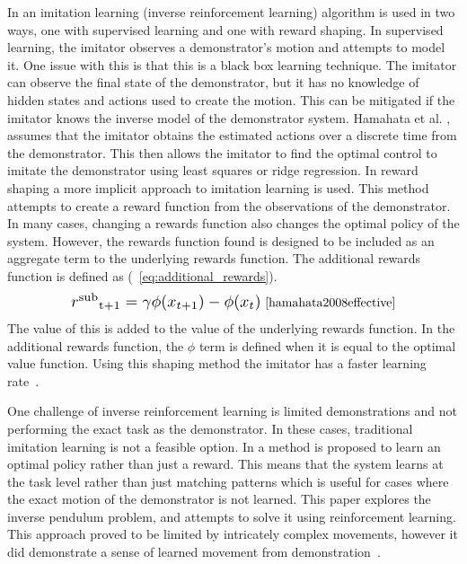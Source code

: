 \documentclass[12pt,american]{report}
\begin{document}
		In \cite{hamahata2008effective} an imitation learning (inverse reinforcement learning) algorithm is used in two ways, one with supervised learning and one with reward shaping. In supervised learning, the imitator observes a demonstrator's motion and attempts to model it. One issue with this is that this is a black box learning technique.  The imitator can observe the final state of the demonstrator, but it has no knowledge of hidden states and actions used to create the motion. This can be mitigated if the imitator knows the inverse model of the demonstrator system. Hamahata et al. \cite{hamahata2008effective}, assumes that the imitator obtains the estimated actions over a discrete time from the demonstrator.  This then allows the imitator to find the optimal control to imitate the demonstrator using least squares or ridge regression. In reward shaping a more implicit approach to imitation learning is used. This method attempts to create a reward function from the observations of the demonstrator.  In many cases, changing a rewards function also changes the optimal policy of the system.  However, the rewards function found is designed to be included as an aggregate term to the underlying rewards function. The additional rewards function is defined as (~\ref{eq:additional_rewards}).
		\begin{equation}
            \label{eq:additional_rewards}
            \resizebox{0.44\textwidth}{!}{$r\textsuperscript{sub}\textsubscript{t+1}= \gamma\phi(x_{t+1})-\phi(x_{t})$}~\cite{hamahata2008effective}
        \end{equation}
		The value of this is added to the value of the underlying rewards function. In the additional rewards function, the \textit{$\phi$} term is defined when it is equal to the optimal value function. Using this shaping method the imitator has a faster learning rate~\cite{hamahata2008effective}.
		
		One challenge of inverse reinforcement learning is limited demonstrations and not performing the exact task as the demonstrator. In these cases, traditional imitation learning is not a feasible option. In \cite{atkeson1997robot} a method is proposed to learn an optimal policy rather than just a reward. This means that the system learns at the task level rather than just matching patterns which is useful for cases where the exact motion of the demonstrator is not learned. This paper explores the inverse pendulum problem, and attempts to solve it using reinforcement learning. This approach proved to be limited by intricately complex movements, however it did demonstrate a sense of learned movement from demonstration~\cite{atkeson1997robot}.
\end{document}
